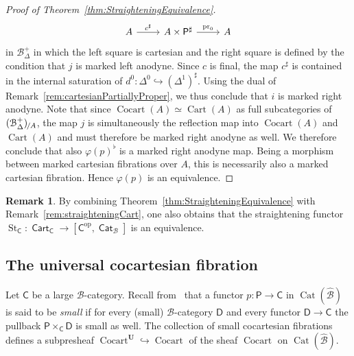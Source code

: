 \documentclass[reqno]{amsart}
\numberwithin{equation}{subsection}
\theoremstyle{plain}
\theoremstyle{definition}
\newtheorem{remark}[equation]{Remark}
\let\scr=\mathcal
\let\phi=\varphi
\let\into=\hookrightarrow
\def\BB{\scr B}
\def\BBB{\widehat{\BB}}
\def\bU{\mathbf{U}}
\DeclareMathOperator{\Cat}{Cat}
\DeclareMathOperator{\ICat}{\mathsf{Cat}}
\DeclareMathOperator{\Cart}{Cart}
\DeclareMathOperator{\Cocart}{Cocart}
\DeclareMathOperator{\ICart}{\mathsf{Cart}}
\DeclareMathOperator{\pr}{pr}
\DeclareMathOperator{\St}{St}
\newcommand{\op}{\mathrm{op}}
\newcommand{\Over}[2]{#1_{\hspace{-1pt}/#2}}
\newcommand{\I}[1]{\mathsf{#1}}
\newcommand{\iFun}[2]{{[#1,#2]}}
\newcommand{\mSimp}[1]{#1_{\Delta}^+}
\begin{document}
\begin{proof}[{Proof of Theorem~\ref{thm:StraighteningEquivalence}}]
\begin{equation*}
\begin{tikzcd}
	A\arrow[r, "c^\sharp"] & A\times\I{P}^\sharp\arrow[r, "\pr_0"] & A 
	\end{tikzcd}
	\end{equation*}
	in $\mSimp\BB$ in which the left square is cartesian and the right square is defined by the condition that $j$ is marked left anodyne. Since $c$ is final, the map $c^\sharp$ is contained in the internal saturation of $d^0\colon \Delta^0\into(\Delta^1)^\sharp$. Using the dual of Remark~\ref{rem:cartesianPartiallyProper}, we thus conclude that $i$ is marked right anodyne. Note that since $\Cocart(A)\simeq\Cart(A)$ as full subcategories of $\Over{(\mSimp\BB)}{A}$, the map $j$ is simultaneously the reflection map into $\Cocart(A)$ and $\Cart(A)$ and must therefore be marked right anodyne as well. We therefore conclude that also $\phi(p)^\flat$ is a marked right anodyne map. Being a morphism between marked cartesian fibrations over $A$, this is necessarily also a marked cartesian fibration. Hence $\phi(p)$ is an equivalence.
\end{proof}

\begin{remark}
	\label{rem:straighteningEquivalenceCart}
	By combining Theorem~\ref{thm:StraighteningEquivalence} with Remark~\ref{rem:straighteningCart}, one also obtains that the straightening functor $\St_{\I{C}}\colon\ICart_{\I{C}}\to\iFun{\I{C}^{\op}}{\ICat_{\BB}}$ is an equivalence.
\end{remark}

\subsection{The universal cocartesian fibration}
\label{sec:universalCocartesianFibration}
Let $\I{C}$ be a large $\BB$-category. Recall from~\cite[\S~4.5]{Martini2021} that a functor $p\colon \I{P}\to\I{C}$ in $\Cat(\BBB)$ is said to be \emph{small} if for every (small) $\BB$-category $\I{D}$ and every functor $\I{D}\to\I{C}$ the pullback $\I{P}\times_{\I{C}}\I{D}$ is small as well. The collection of {small} cocartesian fibrations defines a subpresheaf $\Cocart^{\bU}\into\Cocart$ of the sheaf $\Cocart$ on $\Cat(\BBB)$. 
\end{document}
